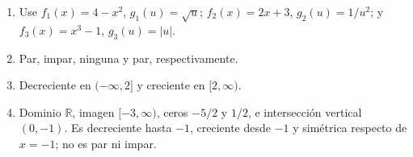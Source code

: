 \begin{solucion}
\begin{enumerate}
\[  \]
  \[
  (g\circ f)(x)=x-1,\quad \operatorname{Dom}=[1,\infty).
  \]
  \item Use $f_1(x)=4-x^2$, $g_1(u)=\sqrt{u}$; $f_2(x)=2x+3$, $g_2(u)=1/u^2$; y $f_3(x)=x^3-1$, $g_3(u)=|u|$.
  \item Par, impar, ninguna y par, respectivamente.
  \item Decreciente en $(-\infty,2]$ y creciente en $[2,\infty)$.
  \item Dominio $\mathbb{R}$, imagen $[-3,\infty)$, ceros $-5/2$ y $1/2$, e intersección vertical $(0,-1)$. Es decreciente hasta $-1$, creciente desde $-1$ y simétrica respecto de $x=-1$; no es par ni impar.
\end{enumerate}
\end{solucion}
\fi

\ifdefined\documentoSemanal
\else
{}

\fi
